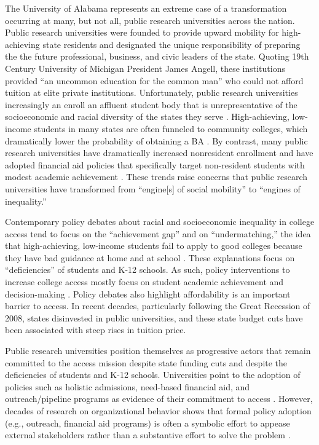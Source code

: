 \documentclass[twoside]{article}
\begin{document}
The University of Alabama represents an extreme case of a transformation occurring at many, but not all, public research universities across the nation.  Public research universities were founded to provide upward mobility for high-achieving state residents \citep{RN2269} and designated the unique responsibility of preparing the the future professional, business, and civic leaders of the state.  Quoting 19th Century University of Michigan President James Angell, these institutions provided ``an uncommon education for the common man'' \citep[as cited in][p. 279]{RN3608} who could not afford tuition at elite private institutions.  Unfortunately, public research universities increasingly an enroll an affluent student body that is unrepresentative of the socioeconomic and racial diversity of the states they serve \citep{RN3685,RN4247,RN4438,RN4439}. High-achieving, low-income students in many states are often funneled to community colleges, which dramatically lower the probability of obtaining a BA \citep{RN2261}. By contrast, many public research universities have dramatically increased nonresident enrollment \citep{RN3753} and have adopted financial aid policies that specifically target non-resident students with modest academic achievement \citep{RN1469,RN3762,RN4032,RN4409}. These trends raise concerns that public research universities have transformed from ``engine[s] of social mobility'' \citep[][p. 3]{RN1149} to ``engines of inequality.''

Contemporary policy debates about racial and socioeconomic inequality in college access tend to focus on the ``achievement gap'' and on ``undermatching,'' the idea that high-achieving, low-income students fail to apply to good colleges because they have bad guidance at home and at school \citep{RN4016}.  These explanations focus on ``deficiencies'' of students and K-12 schools. As such, policy interventions to increase college access mostly focus on student academic achievement and decision-making \citep{RN4351}. Policy debates also highlight affordability is an important barrier to access. In recent decades, particularly following the Great Recession of 2008, states disinvested in public universities, and these state budget cuts have been associated with steep rises in tuition price. 

Public research universities position themselves as progressive actors that remain committed to the access mission despite state funding cuts and despite the deficiencies of students and K-12 schools. Universities point to the adoption of policies such as holistic admissions, need-based financial aid, and outreach/pipeline programs as evidence of their commitment to access \citep{RN4017}.  However, decades of research on organizational behavior shows that formal policy adoption (e.g., outreach, financial aid programs) is often a symbolic effort to appease external stakeholders rather than a substantive effort to solve the problem \citep{RN2436}.
\end{document}
